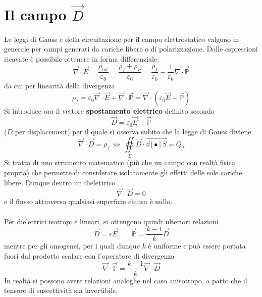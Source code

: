 \section{Il campo $\vec{D}$}
Le leggi di Gauss e della circuitazione per il campo elettrostatico valgono in generale per campi generati da cariche libere o di polarizzazione. Dalle espressioni ricavate è possibile ottenere in forma differenziale:
\[\vec{\nabla} \cdot \vec{E} = \frac{\rho_{tot}}{\varepsilon_0} = \frac{\rho_f + \rho_P}{\varepsilon_0} = \frac{\rho_{f}}{\varepsilon_0} - \frac{1}{\varepsilon_0} \vec{\nabla} \cdot \vec{\mathbb{P}}\]
da cui per linearità della divergenza
\[\rho_f = \varepsilon_0 \vec{\nabla} \cdot \vec{E} + \vec{\nabla} \cdot \vec{\mathbb{P}} = \vec{\nabla} \cdot (\varepsilon_0 \vec{E} + \vec{\mathbb{P}})\]
Si introduce ora il vettore \textbf{spostamento elettrico} definito secondo
\[\vec{D} = \varepsilon_0 \vec{E} + \vec{\mathbb{P}}\]
($D$ per displacement) per il quale si osserva subito che la legge di Gauss diviene
\[\vec{\nabla} \cdot \vec{D} = \rho_f \, \Leftrightarrow \, \oiint\limits_{\Sigma} \vec{D} \cdot \vec{\dd[•]{S}} = Q_f\]
Si tratta di uno strumento matematico (più che un campo con realtà fisica propria) che permette di considerare isolatamente gli effetti delle sole cariche libere. Dunque dentro un dielettrico
\[\vec{\nabla} \cdot \vec{D} = 0\]
e il flusso attraverso qualsiasi superficie chiusa è nullo.
\\~\\
Per dielettrici isotropi e lineari, si ottengono quindi ulteriori relazioni
\[\vec{D} = \varepsilon \vec{E} \qquad \vec{\mathbb{P}} = \frac{k-1}{k} \vec{D}\]
mentre per gli omogenei, per i quali dunque $k$ è uniforme e può essere portata fuori dal prodotto scalare con l'operatore di divergenza
\[\vec{\nabla} \cdot \vec{\mathbb{P}} = \frac{k-1}{k} \vec{\nabla} \cdot \vec{D}\]
In realtà si possono avere relazioni analoghe nel caso anisotropo, a patto che il tensore di suscettività sia invertibile.

